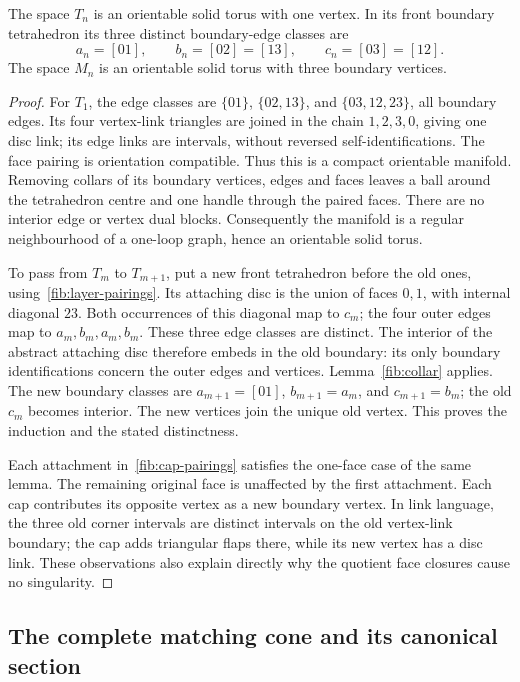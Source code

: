 \begin{proposition}
\label{fib:solid-torus}
The space \(T_n\) is an orientable solid torus with one vertex.  In its
front boundary tetrahedron its three distinct boundary-edge classes are
\[
 a_n=[01],\qquad b_n=[02]=[13],\qquad c_n=[03]=[12].
\]
The space \(M_n\) is an orientable solid torus with three boundary
vertices.
\end{proposition}
\begin{proof}
For \(T_1\), the edge classes are
\(\{01\}\), \(\{02,13\}\), and \(\{03,12,23\}\), all boundary
edges.  Its four vertex-link triangles are joined in the chain
\(1,2,3,0\), giving one disc link; its edge links are intervals, without
reversed self-identifications.  The face pairing is orientation compatible.
Thus this is a compact orientable manifold.  Removing collars of its
boundary vertices, edges and faces leaves a ball around the tetrahedron
centre and one handle through the paired faces.  There are no interior
edge or vertex dual blocks.  Consequently the manifold is a regular
neighbourhood of a one-loop graph, hence an orientable solid torus.

To pass from \(T_m\) to \(T_{m+1}\), put a new front tetrahedron before
the old ones, using~\eqref{fib:layer-pairings}.  Its attaching disc is
the union of faces \(0,1\), with internal diagonal \(23\).  Both
occurrences of this diagonal map to \(c_m\); the four outer edges map
to \(a_m,b_m,a_m,b_m\).  These three edge classes are distinct.
The interior of the abstract attaching disc therefore embeds in the old
boundary: its only boundary identifications concern the outer edges and
vertices.  Lemma~\ref{fib:collar} applies.  The new boundary classes are
\(a_{m+1}=[01]\), \(b_{m+1}=a_m\), and \(c_{m+1}=b_m\);
the old \(c_m\) becomes interior.  The new vertices join the unique
old vertex.  This proves the induction and the stated distinctness.

Each attachment in~\eqref{fib:cap-pairings} satisfies the one-face case
of the same lemma.  The remaining original face is unaffected by the
first attachment.  Each cap contributes its opposite vertex as a new
boundary vertex.  In link language, the three old corner intervals are
distinct intervals on the old vertex-link boundary; the cap adds triangular
flaps there, while its new vertex has a disc link.  These observations
also explain directly why the quotient face closures cause no singularity.
\end{proof}

\subsection{The complete matching cone and its canonical section}
\label{fib:matching}

